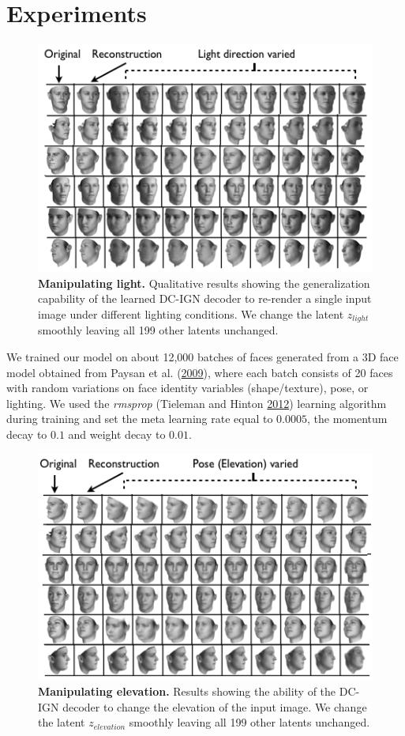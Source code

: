 \documentclass[12pt,twoside]{mitthesis}
\begin{document}
\section{Experiments}\label{experiments}

\begin{figure}[htbp]
\centering
\includegraphics{figures/lightvaried.png}
\caption{\label{fig:manipulating_light}\textbf{Manipulating light.}
Qualitative results showing the generalization capability of the learned
DC-IGN decoder to re-render a single input image under different
lighting conditions. We change the latent $z_{light}$ smoothly leaving
all 199 other latents unchanged.}
\end{figure}

We trained our model on about 12,000 batches of faces generated from a
3D face model obtained from Paysan et al.
(\protect\hyperlink{ref-paysan2009face}{2009}), where each batch
consists of 20 faces with random variations on face identity variables
(shape/texture), pose, or lighting. We used the \emph{rmsprop} (Tieleman
and Hinton \protect\hyperlink{ref-rmsprop}{2012}) learning algorithm
during training and set the meta learning rate equal to $0.0005$, the
momentum decay to $0.1$ and weight decay to $0.01$.

\begin{figure}[htbp]
\centering
\includegraphics{figures/elvaried.png}
\caption{\label{fig:manipulating_elevation}\textbf{Manipulating
elevation.} Results showing the ability of the DC-IGN decoder to change
the elevation of the input image. We change the latent $z_{elevation}$
smoothly leaving all 199 other latents unchanged.}
\end{figure}
\end{document}

